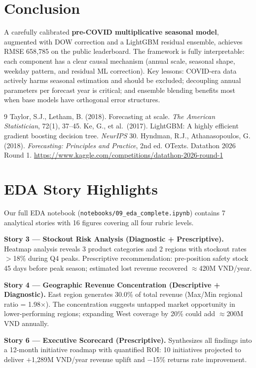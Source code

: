 \documentclass{article}
\begin{document}
\section{Conclusion}

A carefully calibrated \textbf{pre-COVID multiplicative seasonal model}, augmented with DOW correction and a LightGBM residual ensemble, achieves RMSE 658{,}785 on the public leaderboard.
The framework is fully interpretable: each component has a clear causal mechanism (annual scale, seasonal shape, weekday pattern, and residual ML correction).
Key lessons: COVID-era data actively harms seasonal estimation and should be excluded; decoupling annual parameters per forecast year is critical; and ensemble blending benefits most when base models have orthogonal error structures.

\begin{thebibliography}{9}
 Taylor, S.J., Letham, B. (2018). Forecasting at scale. \emph{The American Statistician}, 72(1), 37--45.
 Ke, G., et al.\ (2017). LightGBM: A highly efficient gradient boosting decision tree. \emph{NeurIPS} 30.
 Hyndman, R.J., Athanasopoulos, G. (2018). \emph{Forecasting: Principles and Practice}, 2nd ed. OTexts.
 Datathon 2026 Round 1. \url{https://www.kaggle.com/competitions/datathon-2026-round-1}
\end{thebibliography}

\appendix
\section{EDA Story Highlights}

Our full EDA notebook (\texttt{notebooks/09\_eda\_complete.ipynb}) contains 7 analytical stories with 16 figures covering all four rubric levels.

\textbf{Story 3 — Stockout Risk Analysis (Diagnostic + Prescriptive).}
Heatmap analysis reveals 3 product categories and 2 regions with stockout rates $>$18\% during Q4 peaks.
Prescriptive recommendation: pre-position safety stock 45 days before peak season; estimated lost revenue recovered $\approx$420M VND/year.

\textbf{Story 4 — Geographic Revenue Concentration (Descriptive + Diagnostic).}
East region generates 30.0\% of total revenue (Max/Min regional ratio = 1.98$\times$).
The concentration suggests untapped market opportunity in lower-performing regions; expanding West coverage by 20\% could add $\approx$200M VND annually.

\textbf{Story 6 — Executive Scorecard (Prescriptive).}
Synthesizes all findings into a 12-month initiative roadmap with quantified ROI: 10 initiatives projected to deliver $+$1{,}289M VND/year revenue uplift and $-$15\% returns rate improvement.
\end{document}
